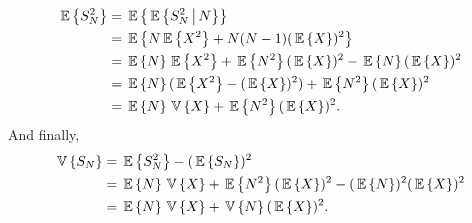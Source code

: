 \begin{question}
\begin{solution}
\begin{equation*}
  \begin{split}
\E{ S_N^2}  &= \E{\E{ S_N^2 \given N}}  \\
&= \E{N \E{X^2} + N(N-1)(\E X)^2 } \\
& = \E N \E{ X^2} + \E{N^2} (\E X)^2 - \E N (\E X)^2 \\
& = \E N (\E{ X^2}  - (\E X)^2) + \E{N^2} (\E X)^2 \\
& = \E N \V X + \E{N^2} (\E X)^2.
  \end{split}
\end{equation*}
And finally,
\begin{equation}
  \begin{split}
  \V{S_N} 
&= \E{S_N^2}  - (\E{S_N})^2 \\
&= \E N \V X + \E{N^2} (\E X)^2   - (\E N)^2 (\E X)^2 \\
&= \E N \V X + \V N (\E X)^2.
  \end{split}
\end{equation}

\end{solution}
\end{question}


